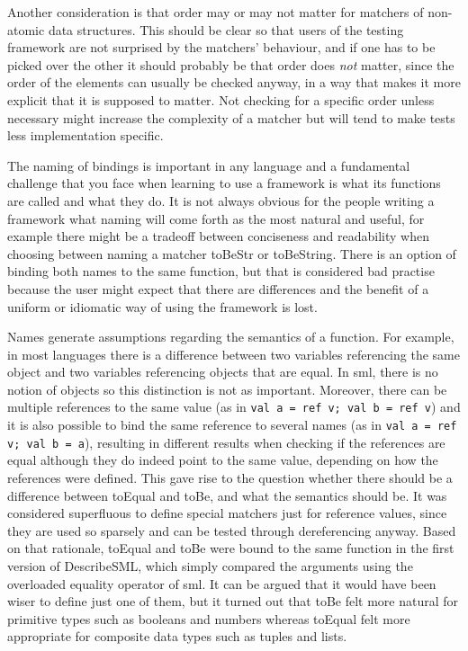 \documentclass[11pt]{article}
\begin{document}
Another consideration is that order may or may not matter for matchers of non-atomic data structures. This should be clear so that users of the testing framework are not surprised by the matchers' behaviour, and if one has to be picked over the other it should probably be that order does \emph{not} matter, since the order of the elements can usually be checked anyway, in a way that makes it more explicit that it is supposed to matter. Not checking for a specific order unless necessary might increase the complexity of a matcher but will tend to make tests less implementation specific.

The naming of bindings is important in any language and a fundamental challenge that you face when learning to use a framework is what its functions are called and what they do. It is not always obvious for the people writing a framework what naming will come forth as the most natural and useful, for example there might be a tradeoff between conciseness and readability when choosing between naming a matcher toBeStr or toBeString. There is an option of binding both names to the same function, but that is considered bad practise because the user might expect that there are differences and the benefit of a uniform or idiomatic way of using the framework is lost.

Names generate assumptions regarding the semantics of a function. For example, in most languages there is a difference between two variables referencing the same object and two variables referencing objects that are equal. In \gls{sml}, there is no notion of objects so this distinction is not as important. Moreover, there can be multiple references to the same value (as in \texttt{val a = ref v; val b = ref v}) and it is also possible to bind the same reference to several names (as in \texttt{val a = ref v; val b = a}), resulting in different results when checking if the references are equal although they do indeed point to the same value, depending on how the references were defined. This gave rise to the question whether there should be a difference between toEqual and toBe, and what the semantics should be. It was considered superfluous to define special matchers just for reference values, since they are used so sparsely and can be tested through dereferencing anyway. Based on that rationale, toEqual and toBe were bound to the same function in the first version of DescribeSML, which simply compared the arguments using the overloaded equality operator of \gls{sml}. It can be argued that it would have been wiser to define just one of them, but it turned out that toBe felt more natural for primitive types such as booleans and numbers whereas toEqual felt more appropriate for composite data types such as tuples and lists.
\end{document}
